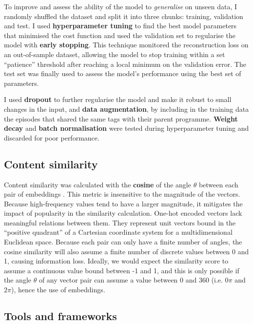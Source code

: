 To improve and assess the ability of the model to \textit{generalise} on unseen data, I randomly shuffled the dataset and split
it into three chunks: training, validation and test. I used \textbf{hyperparameter tuning} to find the best model parameters
that minimised the cost function and used the validation set to regularise the model with \textbf{early stopping}.
This technique monitored the reconstruction loss on an out-of-sample dataset,
allowing the model to stop training within a set ``patience'' threshold after reaching a local minimum on the validation error.
The test set was finally used to assess the model's performance using the best set of parameters.

I used \textbf{dropout} to further regularise the model and make it robust to small changes in the input,
and \textbf{data augmentation}, by including in the training data the episodes that shared the same tags with their
parent programme. \textbf{Weight decay} and \textbf{batch normalisation} were tested during hyperparameter tuning and discarded for poor performance.

\subsection{Content similarity}

Content similarity was calculated with the \textbf{cosine} of the angle $\theta$ between each pair of embeddings \cite{GoogleForDevelopers:EmbeddingSimilarity}.
This metric is insensitive to the magnitude of the vectors. Because high-frequency values tend to have a larger magnitude,
it mitigates the impact of popularity in the similarity calculation.
One-hot encoded vectors lack meaningful relations between them.
They represent unit vectors bound in the ``positive quadrant'' of a Cartesian coordinate system for a multidimensional Euclidean space.
Because each pair can only have a finite number of angles,
the cosine similarity will also assume a finite number of discrete values between 0 and 1, causing information
loss. Ideally, we would expect the similarity score to assume a continuous value bound between -1 and 1, and this
is only possible if the angle $\theta$ of any vector pair can assume a value between 0 and 360 (i.e. $0\pi$ and $2\pi$), hence
the use of embeddings.

\subsection{Tools and frameworks}

